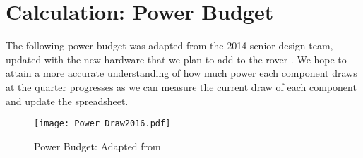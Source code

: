 \appendixpagenumbering
\chapter{Calculation: Power Budget} \label{App:PowerBudget}

The following power budget was adapted from the 2014 senior design team, updated with the new hardware that we plan to add to the rover \cite{rslrover2014}. We hope to attain a more accurate understanding of how much power each component draws at the quarter progresses as we can measure the current draw of each component and update the spreadsheet.

\begin{figure}[H]
\centerline{\texttt{[image: Power\_Draw2016.pdf]}}
\caption[]{Power Budget: Adapted from \cite{rslrover2014}}
\label{fig:PowerBudget}
\end{figure}
